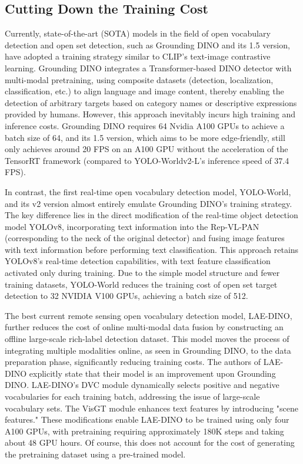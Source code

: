 \documentclass{article}
\begin{document}
\subsection{Cutting Down the Training Cost}
Currently, state-of-the-art (SOTA) models in the field of open vocabulary detection and open set detection, 
such as Grounding DINO and its 1.5 version, have adopted a training strategy similar to CLIP's text-image 
contrastive learning. Grounding DINO integrates a Transformer-based DINO detector with multi-modal pretraining, 
using composite datasets (detection, localization, classification, etc.) to align language and image content, 
thereby enabling the detection of arbitrary targets based on category names or descriptive expressions provided 
by humans. However, this approach inevitably incurs high training and inference costs. Grounding DINO requires 
64 Nvidia A100 GPUs to achieve a batch size of 64, and its 1.5 version, which aims to be more edge-friendly, 
still only achieves around 20 FPS on an A100 GPU without the acceleration of the TensorRT framework (compared 
to YOLO-Worldv2-L's inference speed of 37.4 FPS).

In contrast, the first real-time open vocabulary detection model, YOLO-World, and its v2 version almost 
entirely emulate Grounding DINO's training strategy. The key difference lies in the direct modification of 
the real-time object detection model YOLOv8, incorporating text information into the Rep-VL-PAN (corresponding 
to the neck of the original detector) and fusing image features with text information before performing text 
classification. This approach retains YOLOv8's real-time detection capabilities, with text feature classification 
activated only during training. Due to the simple model structure and fewer training datasets, YOLO-World reduces 
the training cost of open set target detection to 32 NVIDIA V100 GPUs, achieving a batch size of 512.

The best current remote sensing open vocabulary detection model, LAE-DINO, further reduces the cost of 
online multi-modal data fusion by constructing an offline large-scale rich-label detection dataset. This model 
moves the process of integrating multiple modalities online, as seen in Grounding DINO, to the data preparation 
phase, significantly reducing training costs. The authors of LAE-DINO explicitly state that their model is an 
improvement upon Grounding DINO. LAE-DINO's DVC module dynamically selects positive and negative vocabularies 
for each training batch, addressing the issue of large-scale vocabulary sets. The VisGT module enhances text 
features by introducing "scene features." These modifications enable LAE-DINO to be trained using only four 
A100 GPUs, with pretraining requiring approximately 180K steps and taking about 48 GPU hours. Of course, 
this does not account for the cost of generating the pretraining dataset using a pre-trained model.
\end{document}
